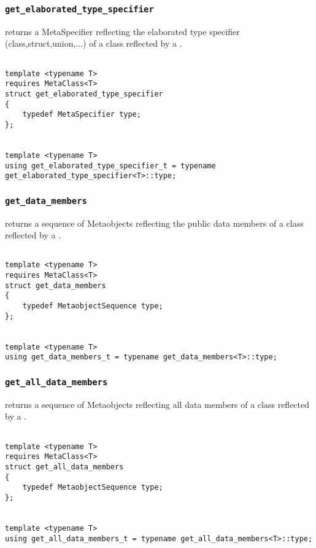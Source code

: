 
\subsubsection{\texttt{get\_elaborated\_type\_specifier}}

returns a MetaSpecifier reflecting the elaborated type specifier (class,struct,union,...) of a class reflected by a .

\begin{verbatim}

template <typename T>
requires MetaClass<T>
struct get_elaborated_type_specifier
{
	typedef MetaSpecifier type;
};


template <typename T>
using get_elaborated_type_specifier_t = typename get_elaborated_type_specifier<T>::type;

\end{verbatim}

\subsubsection{\texttt{get\_data\_members}}

returns a sequence of Metaobjects reflecting the public data members of a class reflected by a .

\begin{verbatim}

template <typename T>
requires MetaClass<T>
struct get_data_members
{
	typedef MetaobjectSequence type;
};


template <typename T>
using get_data_members_t = typename get_data_members<T>::type;

\end{verbatim}

\subsubsection{\texttt{get\_all\_data\_members}}

returns a sequence of Metaobjects reflecting all data members of a class reflected by a .

\begin{verbatim}

template <typename T>
requires MetaClass<T>
struct get_all_data_members
{
	typedef MetaobjectSequence type;
};


template <typename T>
using get_all_data_members_t = typename get_all_data_members<T>::type;

\end{verbatim}
